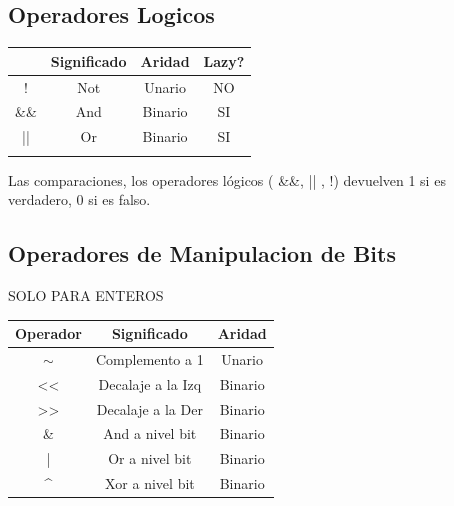 \documentclass{article}
\begin{document}
\subsection{Operadores Logicos}
\begin{table}[H]\centering
    \begin{tabular}{cccl}
    \hline
    \rowcolor[HTML]{C0C0C0} 
    \multicolumn{1}{|c|}{\cellcolor[HTML]{C0C0C0}Operador} & \multicolumn{1}{c|}{\cellcolor[HTML]{C0C0C0}Significado} & \multicolumn{1}{c|}{\cellcolor[HTML]{C0C0C0}Aridad} & \multicolumn{1}{c|}{\cellcolor[HTML]{C0C0C0}Lazy?} \\ \hline
    \multicolumn{1}{|c|}{!}                                & \multicolumn{1}{c|}{Not}                                 & \multicolumn{1}{c|}{Unario}                         & \multicolumn{1}{c|}{NO}                            \\ \hline
    \multicolumn{1}{|c|}{\&\&}                             & \multicolumn{1}{c|}{And}                                 & \multicolumn{1}{c|}{Binario}                        & \multicolumn{1}{c|}{SI}                            \\ \hline
    \multicolumn{1}{|c|}{||}                               & \multicolumn{1}{c|}{Or}                                  & \multicolumn{1}{c|}{Binario}                        & \multicolumn{1}{c|}{SI}                            \\ \hline
    \multicolumn{1}{l}{}                                   & \multicolumn{1}{l}{}                                     & \multicolumn{1}{l}{}                                &                                                   
    \end{tabular}
    \end{table}
Las comparaciones, los operadores lógicos ( \&\&, || , !) devuelven 1 si es verdadero, 0 si es falso.

\subsection{Operadores de Manipulacion de Bits}
SOLO PARA ENTEROS
\begin{table}[H]\centering
    \begin{tabular}{|c|c|c|}
    \hline
    \rowcolor[HTML]{C0C0C0} 
    Operador                     & Significado       & Aridad  \\ \hline
    $\sim$                       & Complemento a 1   & Unario  \\ \hline
    \textless{}\textless{}       & Decalaje a la Izq & Binario \\ \hline
    \textgreater{}\textgreater{} & Decalaje a la Der & Binario \\ \hline
    \&                           & And a nivel bit   & Binario \\ \hline
    |                            & Or a nivel bit    & Binario \\ \hline
    \textasciicircum{}           & Xor a nivel bit   & Binario \\ \hline
    \end{tabular}
    \end{table}
\end{document}
